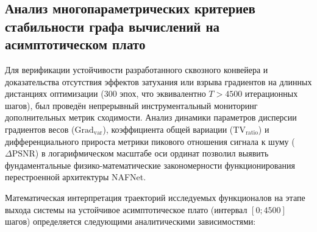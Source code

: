 \documentclass[12pt,a4paper]{article}
\begin{document}
\subsection{Анализ многопараметрических критериев стабильности графа вычислений на асимптотическом плато}

Для верификации устойчивости разработанного сквозного конвейера и доказательства отсутствия эффектов затухания или взрыва градиентов на длинных дистанциях оптимизации (300 эпох, что эквивалентно $T > 4500$ итерационных шагов), был проведён непрерывный инструментальный мониторинг дополнительных метрик сходимости. Анализ динамики параметров дисперсии градиентов весов ($\text{Grad}_{\text{var}}$), коэффициента общей вариации ($\text{TV}_{\text{ratio}}$) и дифференциального прироста метрики пикового отношения сигнала к шуму ($\Delta\text{PSNR}$) в логарифмическом масштабе оси ординат позволил выявить фундаментальные физико-математические закономерности функционирования перестроенной архитектуры NAFNet.

Математическая интерпретация траекторий исследуемых функционалов на этапе выхода системы на устойчивое асимптотическое плато (интервал $[0; 4500]$ шагов) определяется следующими аналитическими зависимостями:
\end{document}
